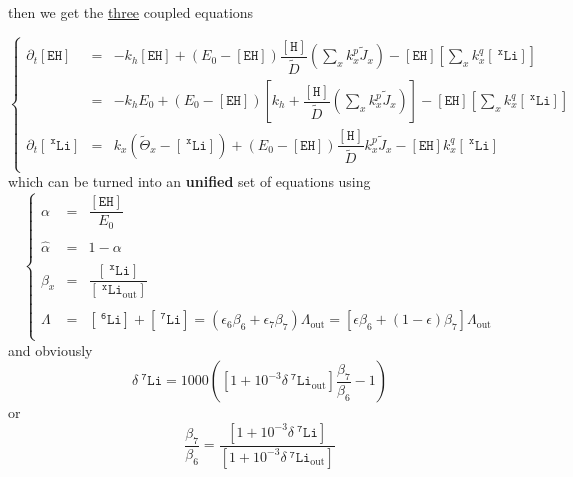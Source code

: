 \documentclass[aps,onecolumn,12pt]{revtex4}
\newcommand{\mychem}[1]{\mathtt{#1}}
\newcommand{\myconc}[1]{\left\lbrack{#1}\right\rbrack}
\newcommand{\spLi}[1]{{~^{\mychem{#1}}\mychem{Li}}}
\newcommand{\Li}[1]{\myconc{\spLi{#1}}}
\newcommand{\spLiOut}[1]{{\spLi{#1}}_{\mathrm{out}}}
\newcommand{\LiOut}[1]{\myconc{\spLiOut{#1}}}
\newcommand{\spEHin}{\mychem{EH}}
\newcommand{\EHin}{\myconc{\spEHin}}
\newcommand{\spproton}{\mychem{H}}
\newcommand{\proton}{\myconc{\spproton}}
\newcommand{\deltaLi}{ {\delta\!\!\!\spLi{7}} }
\newcommand{\deltaLiOut}{{\deltaLi}_{\mathrm{out}}}
\newcommand{\LiAll}{\Lambda}
\newcommand{\LiAllOut}{{\LiAll}_{\mathrm{out}}}
\begin{document}
then we get the \underline{three} coupled equations  

\begin{equation}
\left\lbrace
	\begin{array}{rcl}
		\partial_t\EHin & = & -k_h \EHin + \left(E_0- \EHin\right) \dfrac{\proton}{\tilde{D}} \left(\sum_x k_x^p \tilde{J}_x \right)  
		- \EHin \left\lbrack {\sum_x k_x^q \Li{x}} \right\rbrack\\
		& = & 
		-k_h E_0+ \left(E_0- \EHin\right)\left\lbrack k_h+ \dfrac{\proton}{\tilde{D}} \left(\sum_x k_x^p \tilde{J}_x \right)\right] 
		- \EHin \left\lbrack {\sum_x k_x^q \Li{x}} \right\rbrack\\
		\partial_t\Li{x} & = & k_x \left(\tilde{\Theta}_x -\Li{x} \right)  + \left(E_0-\EHin\right) \dfrac{\proton}{\tilde{D}}   k_x^p \tilde{J}_x  - \EHin k_x^q \Li{x}\\
	\end{array}
\right.
\end{equation}
which can be turned into an \textbf{unified} set of equations using
\begin{equation}
\left\lbrace
\begin{array}{rcl}
	\alpha & = & \dfrac{\EHin}{E_0}\\
	\\
	\hat\alpha & = & 1-\alpha\\
	\\
	\beta_x & = & \dfrac{\Li{x}}{\LiOut{x}}\\
	\\
	\Lambda & = & \Li{6} + \Li{7} = \left(\epsilon_6 \beta_6 + \epsilon_7 \beta_7\right) \LiAllOut = \left[\epsilon \beta_6 + (1-\epsilon) \beta_7\right] \LiAllOut\\
\end{array}
\right.
\end{equation}
and obviously
\begin{equation}
	\deltaLi = 1000 \left ( \left[1+10^{-3}\deltaLiOut\right] \dfrac{\beta_7}{\beta_6}-1\right)
\end{equation}
or
\begin{equation}
	\dfrac{ \beta_7}{\beta_6} = \dfrac{\left[1+10^{-3}\deltaLi\right]}{\left[1+10^{-3}\deltaLiOut\right]}
\end{equation}
\end{document}
